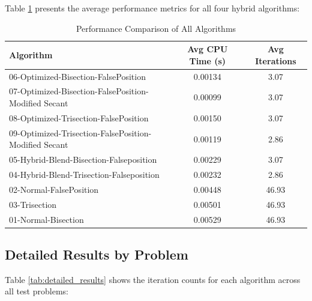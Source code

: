 \documentclass[reprint, amsmath, amssymb, aps, prl]{revtex4-2}
\begin{document}
Table \ref{tab:performance_comparison} presents the average performance metrics for all four hybrid algorithms:

\begin{table}[H]
\centering
\caption{Performance Comparison of All Algorithms}
\label{tab:performance_comparison}
\begin{tabular}{lcc}
\toprule
Algorithm & Avg CPU Time (s) & Avg Iterations \\
\midrule
06-Optimized-Bisection-FalsePosition & 0.00134 & 3.07 \\
07-Optimized-Bisection-FalsePosition-Modified Secant & 0.00099 & 3.07 \\
08-Optimized-Trisection-FalsePosition & 0.00150 & 3.07 \\
09-Optimized-Trisection-FalsePosition-Modified Secant & 0.00119 & 2.86 \\
05-Hybrid-Blend-Bisection-Falseposition & 0.00229 & 3.07 \\
04-Hybrid-Blend-Trisection-Falseposition & 0.00232 & 2.86 \\
02-Normal-FalsePosition & 0.00448 & 46.93 \\
03-Trisection & 0.00501 & 46.93 \\
01-Normal-Bisection & 0.00529 & 46.93 \\
\bottomrule
\end{tabular}
\end{table}

\subsection{Detailed Results by Problem}

Table \ref{tab:detailed_results} shows the iteration counts for each algorithm across all test problems:
\end{document}
